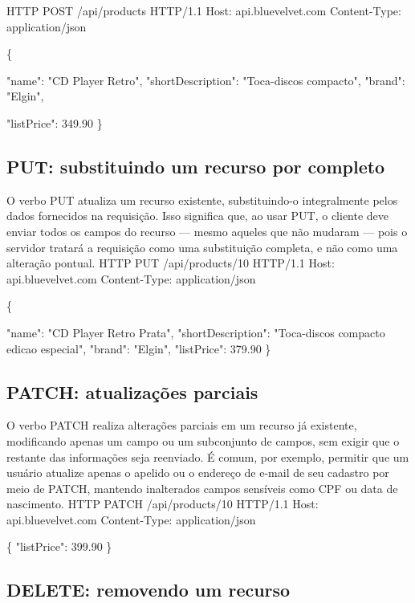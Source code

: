 \begin{infobox}{HTTP}
POST /api/products HTTP/1.1 Host: api.bluevelvet.com Content-Type: application/json
\end{infobox}

\{

\begin{infobox}{"name": "CD Player Retro",}
"shortDescription": "Toca-discos compacto", "brand": "Elgin",
\end{infobox}

"listPrice": 349.90 \}

\subsection{PUT: substituindo um recurso por completo}

O verbo PUT atualiza um recurso existente, substituindo-o integralmente pelos dados fornecidos na requisição. Isso significa que, ao usar PUT, o cliente deve enviar todos os campos do recurso — mesmo aqueles que não mudaram — pois o servidor tratará a requisição como uma substituição completa, e não como uma alteração pontual. HTTP PUT /api/products/10 HTTP/1.1 Host: api.bluevelvet.com Content-Type: application/json

\{

\begin{infobox}{"name": "CD Player Retro Prata",}
"shortDescription": "Toca-discos compacto edicao especial", "brand": "Elgin", "listPrice": 379.90 \}
\end{infobox}

\subsection{PATCH: atualizações parciais}

O verbo PATCH realiza alterações parciais em um recurso já existente, modificando apenas um campo ou um subconjunto de campos, sem exigir que o restante das informações seja reenviado. É comum, por exemplo, permitir que um usuário atualize apenas o apelido ou o endereço de e-mail de seu cadastro por meio de PATCH, mantendo inalterados campos sensíveis como CPF ou data de nascimento. HTTP PATCH /api/products/10 HTTP/1.1 Host: api.bluevelvet.com Content-Type: application/json

\{ "listPrice": 399.90 \}

\subsection{DELETE: removendo um recurso}

